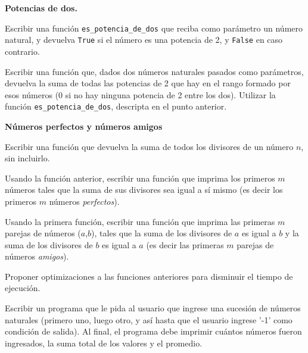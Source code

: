 \begin{ejercicio}
{\bf Potencias de dos.}
\begin{partes}
    \item Escribir una función \verb!es_potencia_de_dos! que reciba como parámetro
un número natural, y devuelva \verb!True! si el número es una potencia de 2,
y \verb!False! en caso contrario.
    \item Escribir una función que, dados dos números naturales pasados como
parámetros, devuelva la suma de todas las potencias de 2 que hay en el
rango formado por esos números (0 si no hay ninguna potencia de 2 entre los
dos). Utilizar la función \verb!es_potencia_de_dos!, descripta en el
punto anterior.
\end{partes}
\end{ejercicio}


\begin{ejercicio}
{\bf Números perfectos y números amigos}
\begin{partes}
    \item Escribir una función que devuelva la suma de todos los divisores de
un número $n$, sin incluirlo.
    \item Usando la función anterior, escribir una función que imprima los
primeros $m$ números tales que la suma de sus divisores sea igual a sí
mismo (es decir los primeros $m$ números {\it perfectos}).
    \item Usando la primera función, escribir una función que imprima las
primeras $m$ parejas de números ($a$,$b$), tales que la suma de los
divisores de $a$ es igual a $b$ y la suma de los divisores de $b$ es igual
a $a$ (es decir las primeras $m$ parejas de números {\it amigos}).
    \item Proponer optimizaciones a las funciones anteriores para disminuir el
tiempo de ejecución.
\end{partes}
\end{ejercicio}

\begin{ejercicio}
Escribir un programa que le pida al usuario que ingrese una sucesión
de números naturales (primero uno, luego otro, y así hasta que el
usuario ingrese '-1' como condición de salida). Al final, el programa
debe imprimir cuántos números fueron ingresados, la suma total de los
valores y el promedio.
\end{ejercicio}


